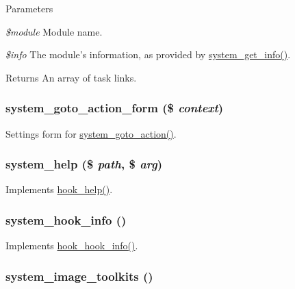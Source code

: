 \begin{DoxyParams}{Parameters}
\item[{\em \$module}]Module name. \item[{\em \$info}]The module's information, as provided by \hyperlink{system_8module_af54208dab08c482b465a7f10225ebbb7}{system\_\-get\_\-info()}.\end{DoxyParams}
\begin{DoxyReturn}{Returns}
An array of task links. 
\end{DoxyReturn}
\hypertarget{system_8module_a9e66ce1cf0a4a3529a1a3140fdbe4660}{
\subsubsection[{system\_\-goto\_\-action\_\-form}]{\setlength{\rightskip}{0pt plus 5cm}system\_\-goto\_\-action\_\-form (\$ {\em context})}}
\label{system_8module_a9e66ce1cf0a4a3529a1a3140fdbe4660}
Settings form for \hyperlink{group__actions_gae5230dbace638d69f196392fbc77e1af}{system\_\-goto\_\-action()}. \hypertarget{system_8module_af0ca5e04a8b6cc3bba72b778f2e8c81d}{
\subsubsection[{system\_\-help}]{\setlength{\rightskip}{0pt plus 5cm}system\_\-help (\$ {\em path}, \/  \$ {\em arg})}}
\label{system_8module_af0ca5e04a8b6cc3bba72b778f2e8c81d}
Implements \hyperlink{group__hooks_ga5589c2714a782738e8851c4c90231f0e}{hook\_\-help()}. \hypertarget{system_8module_a9df96726c754189e19b7f065bcb5c833}{
\subsubsection[{system\_\-hook\_\-info}]{\setlength{\rightskip}{0pt plus 5cm}system\_\-hook\_\-info ()}}
\label{system_8module_a9df96726c754189e19b7f065bcb5c833}
Implements \hyperlink{group__hooks_ga65142e7864f445483786087d180a2010}{hook\_\-hook\_\-info()}. \hypertarget{system_8module_ac5de4c1bb1b8395a6a074df170cbe335}{
\subsubsection[{system\_\-image\_\-toolkits}]{\setlength{\rightskip}{0pt plus 5cm}system\_\-image\_\-toolkits ()}}
